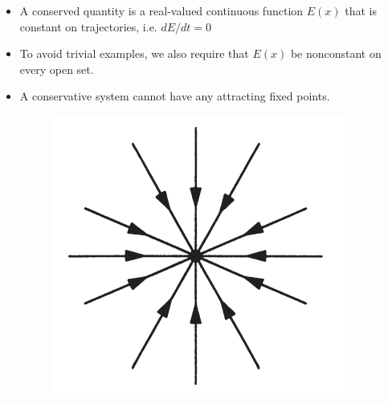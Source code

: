 \documentclass[9pt,aspectratio=43,mathserif,table]{beamer}
\begin{document}
\begin{frame}
	\begin{itemize}
		\item A conserved quantity is a real-valued continuous function $E(x)$ that is constant on trajectories, i.e. $dE/dt = 0$
		\item To avoid trivial examples, we also require that $E(x)$ be nonconstant on every open set.
		\item A conservative system cannot have any attracting fixed points.
		\begin{figure}
			\centering
			\includegraphics[width=0.35\linewidth]{attractingFixedPoints.png}
		\end{figure}
	\end{itemize}
\end{frame}
\end{document}
